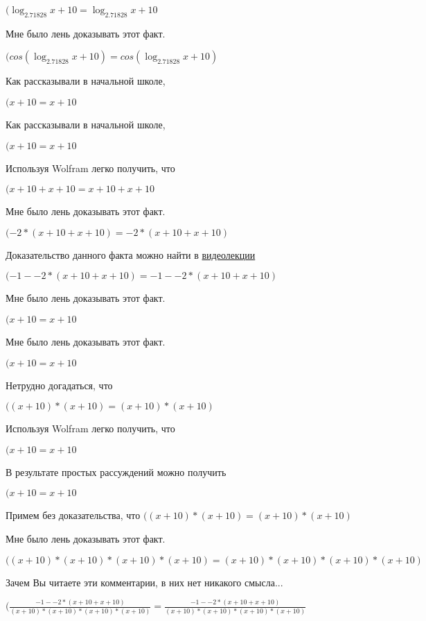 \documentclass[12pt,a4paper,fleqn]{article}
\theoremstyle{definition}
\begin{document}
$(\log_{ 2.71828 }{ x  +  10 } = \log_{ 2.71828 }{ x  +  10 }$

Мне было лень доказывать этот факт.

$(cos(\log_{ 2.71828 }{ x  +  10 }) = cos(\log_{ 2.71828 }{ x  +  10 })$

Как рассказывали в начальной школе,

$( x  +  10  =  x  +  10 $

Как рассказывали в начальной школе,

$( x  +  10  =  x  +  10 $

Используя Wolfram легко получить, что

$( x  +  10  +  x  +  10  =  x  +  10  +  x  +  10 $

Мне было лень доказывать этот факт.

$( -2  * ( x  +  10  +  x  +  10 ) =  -2  * ( x  +  10  +  x  +  10 )$

Доказательство данного факта можно найти в \href{https://www.youtube.com/watch?v=dQw4w9WgXcQ}{видеолекции}

$( -1  -  -2  * ( x  +  10  +  x  +  10 ) =  -1  -  -2  * ( x  +  10  +  x  +  10 )$

Мне было лень доказывать этот факт.

$( x  +  10  =  x  +  10 $

Мне было лень доказывать этот факт.

$( x  +  10  =  x  +  10 $

Нетрудно догадаться, что

$(( x  +  10 ) * ( x  +  10 ) = ( x  +  10 ) * ( x  +  10 )$

Используя Wolfram легко получить, что

$( x  +  10  =  x  +  10 $

В результате простых рассуждений можно получить

$( x  +  10  =  x  +  10 $

Примем без доказательства, что
$(( x  +  10 ) * ( x  +  10 ) = ( x  +  10 ) * ( x  +  10 )$

Мне было лень доказывать этот факт.

$(( x  +  10 ) * ( x  +  10 ) * ( x  +  10 ) * ( x  +  10 ) = ( x  +  10 ) * ( x  +  10 ) * ( x  +  10 ) * ( x  +  10 )$

Зачем Вы читаете эти комментарии, в них нет никакого смысла...

$(\frac{ -1  -  -2  * ( x  +  10  +  x  +  10 )}{( x  +  10 ) * ( x  +  10 ) * ( x  +  10 ) * ( x  +  10 )}
 = \frac{ -1  -  -2  * ( x  +  10  +  x  +  10 )}{( x  +  10 ) * ( x  +  10 ) * ( x  +  10 ) * ( x  +  10 )}
$
\end{document}
